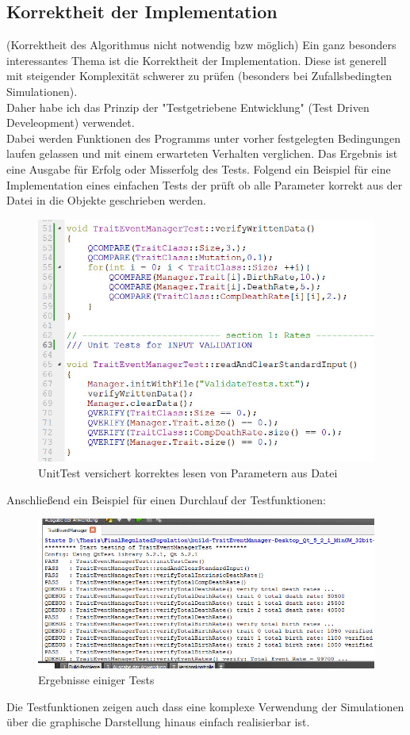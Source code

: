 \documentclass{article}
\begin{document}
	\subsection{Korrektheit der Implementation}
	(Korrektheit des Algorithmus nicht notwendig bzw möglich)
	Ein ganz besonders interessantes Thema ist die Korrektheit der Implementation. Diese ist generell mit steigender Komplexität schwerer zu prüfen (besonders bei Zufallsbedingten Simulationen).\\
	Daher habe ich das Prinzip der "{}Testgetriebene Entwicklung"{}  (Test Driven Develeopment) verwendet.\\
	Dabei werden Funktionen des Programms unter vorher festgelegten Bedingungen laufen gelassen und mit einem erwarteten Verhalten verglichen. Das Ergebnis ist eine Ausgabe für Erfolg oder Misserfolg des Tests. Folgend ein Beispiel für eine Implementation eines einfachen Tests der prüft ob alle Parameter korrekt aus der Datei in die Objekte geschrieben werden.
	\begin{figure}[H]
		\centering
		\includegraphics[width=0.7\linewidth]{./Pictures/UnitTest}
		\caption[UnitTest]{UnitTest versichert korrektes lesen von Parametern aus Datei}
		\label{Unit Test}
	\end{figure}
	Anschließend ein Beispiel für einen Durchlauf der Testfunktionen:
	\begin{figure}[H]
		\centering
		\includegraphics[width=0.7\linewidth]{./Pictures/TestResult_start}
		\caption[Test Resultat einer Test Datei]{Ergebnisse einiger Tests}
		\label{Test Results}
	\end{figure}
	Die Testfunktionen zeigen auch dass eine komplexe Verwendung der Simulationen über die graphische Darstellung hinaus einfach realisierbar ist.
	
\end{document}
